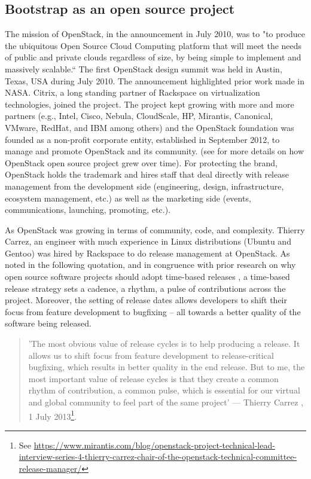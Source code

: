 \documentclass[dvipsnames]{interact}
\theoremstyle{plain}\newtheorem{theorem}{Theorem}[section]
\theoremstyle{definition}
\theoremstyle{remark}
\begin{document}
\subsection{Bootstrap as an open source project}

The mission of OpenStack, in the announcement in July 2010, was to "to produce the ubiquitous Open Source Cloud Computing platform that will meet the needs of public and private clouds regardless of size, by being simple to implement and massively scalable.`` The first OpenStack design summit was held in Austin, Texas, USA during July 2010. The announcement highlighted prior work made in NASA. Citrix, a long standing partner of Rackspace on virtualization technologies,  joined the project.  The project kept growing with more and more partners (e.g., Intel, Cisco, Nebula, CloudScale, HP, Mirantis, Canonical, VMware, RedHat, and IBM among others) and the OpenStack foundation was founded as a non-profit corporate entity, established in September 2012, to manage and promote OpenStack and its community. 
(see \cite{Teixeira_et_al2015,teixeira_and_Hyrynsalmi2017icsob} for more details on how OpenStack open source project grew over time). For protecting the brand, OpenStack holds the trademark and hires staff that deal directly with release management from the development side (engineering, design, infrastructure, ecosystem management, etc.) as well as the marketing side (events, communications, launching, promoting, etc.). 

As OpenStack was growing in terms of community, code, and complexity.  Thierry Carrez, an engineer with much experience in  Linux distributions (Ubuntu and Gentoo) was hired by Rackspace to do release management at OpenStack. As noted in the following quotation, and in congruence with prior research on why open source software projects should adopt time-based releases \cite{MichlmayrFitzgerald_et_al2015}, a time-based release strategy sets a cadence, a rhythm, a pulse of contributions across the project. Moreover, the setting of release dates allows developers to shift their focus from feature development to bugfixing -- all towards a better quality of the software being released. 


\begin{quotation}
\footnotesize
'The most obvious value of release cycles is to help producing a release. It allows us to shift focus from feature development to release-critical bugfixing, which results in better quality in the end release. But to me, the most important value of release cycles is that they create a common rhythm of contribution, a common pulse, which is essential for our virtual and global community to feel part of the same project' --- Thierry Carrez , 1 July 2013\footnote{See \url{https://www.mirantis.com/blog/openstack-project-technical-lead-interview-series-4-thierry-carrez-chair-of-the-openstack-technical-committee-release-manager/}}. 
\end{quotation}
\end{document}
